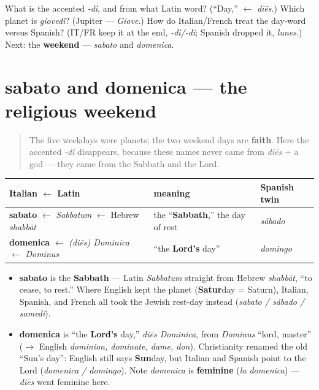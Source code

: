\begin{tcolorbox}[breakable,colback=teal!4,colframe=teal!35!black,title={Before you move on}]
What is the accented \emph{-dì}, and from what Latin word? (\textquotedblleft{}Day,\textquotedblright{} $\leftarrow$ \emph{diēs}.) Which planet is \emph{giovedì}? (Jupiter — \emph{Giove}.) How do Italian/French treat the day-word versus Spanish? (IT/FR keep it at the end, \emph{-dì/-di}; Spanish dropped it, \emph{lunes}.) Next: the \textbf{weekend} — \emph{sabato} and \emph{domenica}.
\end{tcolorbox}
\section[sabato, domenica]{sabato and domenica — the religious weekend}

\label{lesson:IT-C07-giorni-2}



\begin{quote}
The five weekdays were planets; the two weekend days are \textbf{faith}. Here the accented \emph{-dì} disappears, because these names never came from \emph{diēs} + a god — they came from the Sabbath and the Lord.
\end{quote}

\begin{cousinweb}
\noindent
\begin{tabularx}{\linewidth}{@{}>{\raggedright\arraybackslash}X>{\raggedright\arraybackslash}X>{\raggedright\arraybackslash}X@{}}
\toprule
\textbf{Italian $\leftarrow$ Latin} & \textbf{meaning} & \textbf{Spanish twin} \\
\midrule
\textbf{sabato} $\leftarrow$ \emph{Sabbatum} $\leftarrow$ Hebrew \emph{shabbāt} & the \textquotedblleft{}\textbf{Sabbath},\textquotedblright{} the day of rest & \emph{sábado} \\
\textbf{domenica} $\leftarrow$ \emph{(diēs) Dominica} $\leftarrow$ \emph{Dominus} & \textquotedblleft{}the \textbf{Lord's} day\textquotedblright{} & \emph{domingo} \\
\bottomrule
\end{tabularx}

\begin{itemize}
\raggedright
  \item \textbf{sabato} is the \textbf{Sabbath} — Latin \emph{Sabbatum} straight from Hebrew \emph{shabbāt}, \textquotedblleft{}to cease, to rest.\textquotedblright{} Where English kept the planet (\textbf{Satur}day = Saturn), Italian, Spanish, and French all took the Jewish rest-day instead (\emph{sabato / sábado / samedi}).
  \item \textbf{domenica} is \textquotedblleft{}the \textbf{Lord's} day,\textquotedblright{} \emph{diēs Dominica}, from \emph{Dominus} \textquotedblleft{}lord, master\textquotedblright{} ($\to$ English \emph{dominion, dominate, dame, don}). Christianity renamed the old \textquotedblleft{}Sun's day\textquotedblright{}: English still says \textbf{Sun}day, but Italian and Spanish point to the Lord (\emph{domenica / domingo}). Note \emph{domenica} is \textbf{feminine} (\emph{la domenica}) — \emph{diēs} went feminine here.
\end{itemize}
\end{cousinweb}

